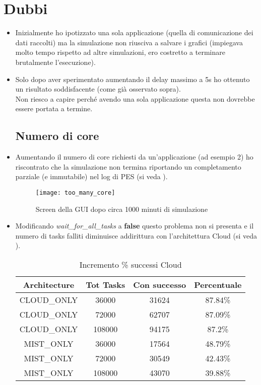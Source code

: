\documentclass[12pt, a4paper]{report} %
\begin{document}
\section*{Dubbi}
\label{Dubbi}
	\begin{itemize}
	\subsection*{Numero di applicazioni}
		\item Inizialmente ho ipotizzato una sola applicazione (quella di comunicazione dei dati raccolti) ma la simulazione non riusciva a salvare i grafici (impiegava molto tempo rispetto ad altre simulazioni, ero costretto a terminare brutalmente l'esecuzione).\\
		\item Solo dopo aver sperimentato aumentando il delay massimo a 5s ho ottenuto un risultato soddisfacente (come già osservato sopra).\\
		Non riesco a capire perché avendo una sola applicazione questa non dovrebbe essere portata a termine.
		
	\subsection*{Numero di core}
	
	\item Aumentando il numero di core richiesti da un'applicazione (ad esempio 2) ho riscontrato che la simulazione non termina riportando un completamento parziale (e immutabile) nel log di PES (si veda ).
	\begin{figure}
		\texttt{[image: too\_many\_core]}
		\caption{Screen della GUI dopo circa 1000 minuti di simulazione}
		\centering
		\label{GUI}
	\end{figure}
	
	\item Modificando \textit{wait\_for\_all\_tasks} a \textbf{false} questo problema non si presenta e il numero di tasks falliti diminuisce addirittura con l'architettura Cloud (si veda ).
	\begin{table}[h!]
	\begin{center}
	\begin{tabular}{|| c | c | c | c ||} %
		\hline
		Architecture & Tot Tasks & Con successo & Percentuale\\ [1ex] 
		\hline
		\hline
		CLOUD\_ONLY & 36000 & 31624 & 87.84\%\\
		\hline
		CLOUD\_ONLY & 72000 & 62707 & 87.09\%\\
		\hline
		CLOUD\_ONLY & 108000 & 94175 & 87.2\%\\
		\hline
		MIST\_ONLY & 36000 & 17564 & 48.79\%\\
		\hline
		MIST\_ONLY & 72000 & 30549 & 42.43\%\\
		\hline
		MIST\_ONLY & 108000 & 43070 & 39.88\%\\ 
		\hline
	\end{tabular}
	\caption{Incremento \% successi Cloud}
	\label{tab:2}
	\end{center}
	\end{table}\\
	\FloatBarrier

\end{itemize}
\end{document}

